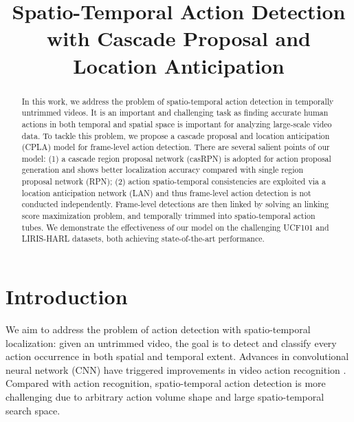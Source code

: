 \documentclass{bmvc2k}
\title{Spatio-Temporal Action Detection with Cascade Proposal and Location Anticipation}
\begin{document}
\maketitle

\begin{abstract}
In this work, we address the problem of spatio-temporal action detection in temporally untrimmed videos. It is an important and challenging task as finding accurate human actions in both temporal and spatial space is important for analyzing large-scale video data. To tackle this problem, we propose a cascade proposal and location anticipation (CPLA) model for frame-level action detection. There are several salient points of our model: (1) a cascade region proposal network (casRPN) is adopted for action proposal generation and shows better localization accuracy compared with single region proposal network (RPN); (2) action spatio-temporal consistencies are exploited via a location anticipation network (LAN) and thus frame-level action detection is not conducted independently. Frame-level detections are then linked by solving an linking score maximization problem, and temporally trimmed into spatio-temporal action tubes. We demonstrate the effectiveness of our model on the challenging UCF101 and LIRIS-HARL datasets, both achieving state-of-the-art performance.

\end{abstract}

\section{Introduction}
\label{sec:intro}

We aim to address the problem of action detection with spatio-temporal localization: given an untrimmed video, the goal is to detect and classify every action occurrence in both spatial and temporal extent. Advances in convolutional neural network (CNN) have triggered improvements in video action recognition \cite{simonyan2014two,gkioxari2015contextual,gan2016webly}. Compared with action recognition, spatio-temporal action detection is more challenging due to arbitrary action volume shape and large spatio-temporal search space.
\end{document}
